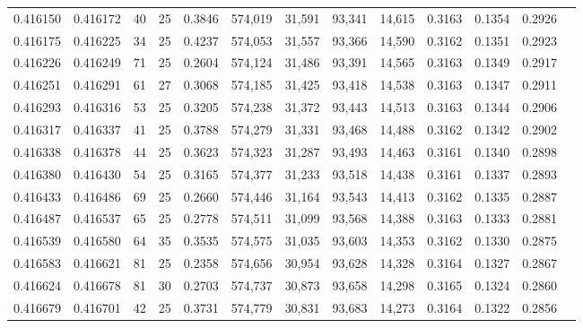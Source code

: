 \begin{tabular}{rrrrrrrrrrrrr}
0.416150 & 0.416172 &    40 &  25 &                                     0.3846 & 574,019 &  31,591 &  93,341 &  14,615 & 0.3163 & 0.1354 & 0.2926 \\
0.416175 & 0.416225 &    34 &  25 &                                     0.4237 & 574,053 &  31,557 &  93,366 &  14,590 & 0.3162 & 0.1351 & 0.2923 \\
0.416226 & 0.416249 &    71 &  25 &                                     0.2604 & 574,124 &  31,486 &  93,391 &  14,565 & 0.3163 & 0.1349 & 0.2917 \\
0.416251 & 0.416291 &    61 &  27 &                                     0.3068 & 574,185 &  31,425 &  93,418 &  14,538 & 0.3163 & 0.1347 & 0.2911 \\
0.416293 & 0.416316 &    53 &  25 &                                     0.3205 & 574,238 &  31,372 &  93,443 &  14,513 & 0.3163 & 0.1344 & 0.2906 \\
0.416317 & 0.416337 &    41 &  25 &                                     0.3788 & 574,279 &  31,331 &  93,468 &  14,488 & 0.3162 & 0.1342 & 0.2902 \\
0.416338 & 0.416378 &    44 &  25 &                                     0.3623 & 574,323 &  31,287 &  93,493 &  14,463 & 0.3161 & 0.1340 & 0.2898 \\
0.416380 & 0.416430 &    54 &  25 &                                     0.3165 & 574,377 &  31,233 &  93,518 &  14,438 & 0.3161 & 0.1337 & 0.2893 \\
0.416433 & 0.416486 &    69 &  25 &                                     0.2660 & 574,446 &  31,164 &  93,543 &  14,413 & 0.3162 & 0.1335 & 0.2887 \\
0.416487 & 0.416537 &    65 &  25 &                                     0.2778 & 574,511 &  31,099 &  93,568 &  14,388 & 0.3163 & 0.1333 & 0.2881 \\
0.416539 & 0.416580 &    64 &  35 &                                     0.3535 & 574,575 &  31,035 &  93,603 &  14,353 & 0.3162 & 0.1330 & 0.2875 \\
0.416583 & 0.416621 &    81 &  25 &                                     0.2358 & 574,656 &  30,954 &  93,628 &  14,328 & 0.3164 & 0.1327 & 0.2867 \\
0.416624 & 0.416678 &    81 &  30 &                                     0.2703 & 574,737 &  30,873 &  93,658 &  14,298 & 0.3165 & 0.1324 & 0.2860 \\
0.416679 & 0.416701 &    42 &  25 &                                     0.3731 & 574,779 &  30,831 &  93,683 &  14,273 & 0.3164 & 0.1322 & 0.2856 \\

\end{tabular}
